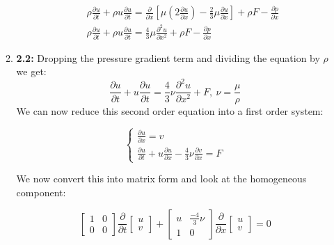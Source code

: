 \documentclass{article}
\begin{document}
\begin{enumerate}
\begin{enumerate}
\begin{eqnarray}
&& \rho \frac{\partial u}{\partial t} + \rho u \frac{\partial u}{\partial t} = \frac{\partial}{\partial x}\left[\mu(2\frac{\partial u}{\partial x})-\frac{2}{3}\mu\frac{\partial u}{\partial x} \right] + \rho F - \frac{\partial p}{\partial x}\nonumber \\
&& \boxed{\rho \frac{\partial u}{\partial t} + \rho u \frac{\partial u}{\partial t} = \frac{4}{3}\mu\frac{\partial^2 u}{\partial x^2} + \rho F - \frac{\partial p}{\partial x}}
\end{eqnarray}

\item \textbf{2.2:}
Dropping the pressure gradient term and dividing the equation by $\rho$ we get:
\begin{equation}
\frac{\partial u}{\partial t} + u \frac{\partial u}{\partial t} = \frac{4}{3}\nu\frac{\partial^2 u}{\partial x^2} +  F,\ \nu = \frac{\mu}{\rho}
\end{equation}
We can now reduce this second order equation into a first order system:

\begin{equation}
  \left\{\begin{array}{l}
    \frac{\partial u}{\partial x} = v\\
    \frac{\partial u}{\partial t} + u \frac{\partial u}{\partial x} - \frac{4}{3}\nu\frac{\partial v}{\partial x} = F \end{array}\right.
\end{equation}

We now convert this into matrix form and look at the homogeneous component:

\begin{equation}
\left[\begin{array}{cc} 1 & 0 \\ 0 & 0\end{array} \right] \frac{\partial}{\partial t}\left[\begin{array}{c}u \\ v \end{array} \right] + \left[\begin{array}{cc}u & \frac{-4}{3}\nu \\ 1 & 0  \end{array} \right]\frac{\partial}{\partial x}\left[\begin{array}{c}u \\ v \end{array} \right]=0
\end{equation}


\end{enumerate}
\end{enumerate}
\end{document}

